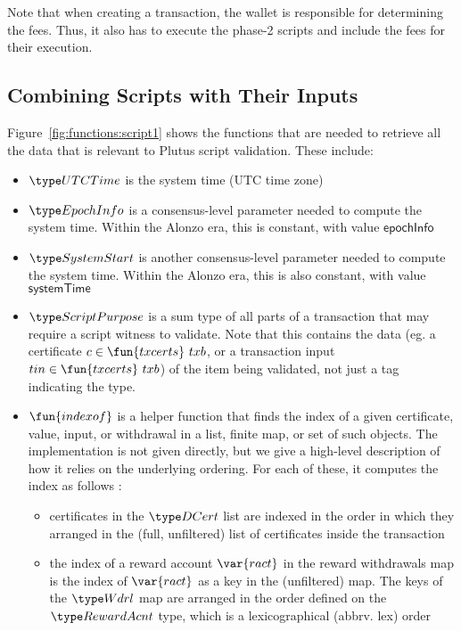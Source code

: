 Note that when creating a transaction, the wallet is responsible for
determining the fees. Thus, it also has to execute the phase-2 scripts
and include the fees for their execution.

\subsection{Combining Scripts with Their Inputs}
\label{sec:scripts-inputs}

Figure~\ref{fig:functions:script1} shows the functions that are needed to
retrieve all the data that is relevant to Plutus script validation.
These include:

\begin{itemize}
\item $\UTCTime$ is the system time (UTC time zone)
\item $\EpochInfo$ is a consensus-level parameter needed to compute the system time. Within
the Alonzo era, this is constant, with value $\mathsf{epochInfo}$
\item $\SystemStart$ is another consensus-level parameter needed to compute the system time. Within
the Alonzo era, this is also constant, with value $\mathsf{systemTime}$
\item
  $\ScriptPurpose$ is a sum type of all parts of a transaction that may
  require a script witness to validate. Note that this contains the data
  (eg. a certificate $c \in \fun{txcerts}~{txb}$,
  or a transaction input $tin \in \fun{txcerts}~{txb}$) of the item being validated,
  not just a tag indicating the type.
\item
  $\fun{indexof}$ is a helper function that finds the index of a given certificate, value, input, or
  withdrawal in a list, finite map, or set of such objects. The implementation is not given
  directly, but we give a high-level description of how it relies on the underlying ordering.
  For each of these, it computes the index as follows :
  \begin{itemize}
    \item certificates in the $\DCert$ list are indexed in the order in which they arranged
    in the (full, unfiltered) list of certificates inside the transaction
    \item the index of a reward account $\var{ract}$ in the reward withdrawals map is
    the index of $\var{ract}$ as a key in the (unfiltered) map. The keys of the $\Wdrl$
    map are arranged in the order defined on the $\RewardAcnt$ type, which is a lexicographical
    (abbrv. lex) order

\end{itemize}
\end{itemize}
